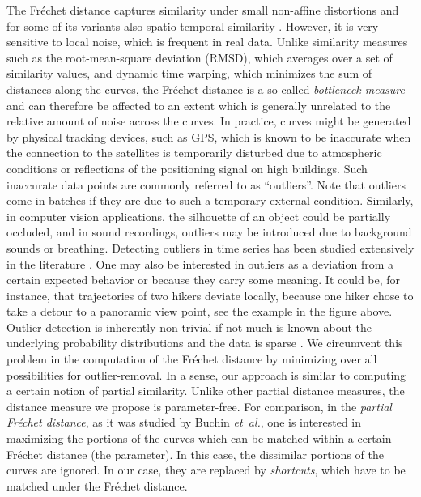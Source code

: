 \documentclass[12pt]{article}
\newcommand{\etal}{\textit{et~al.}\xspace}
\newcommand{\Frechet}{Fr\'{e}c{h}e{}t\xspace}\providecommand{\Arr}{\mathop{\mathrm{\EuScript{A}}}}
\numberwithin{figure}{section}
\numberwithin{equation}{section}
\begin{document}
The \Frechet distance captures similarity under small non-affine
distortions and for some of its variants also spatio-temporal
similarity \cite{mssz-fdsl-2011}.  However, it is very sensitive to
local noise, which is frequent in real data.  Unlike similarity
measures such as the root-mean-square deviation (RMSD), which averages
over a set of similarity values, and dynamic time warping, which
minimizes the sum of distances along the curves, the \Frechet distance
is a so-called \emph{bottleneck measure} and can therefore be affected
to an extent which is generally unrelated to the relative amount of
noise across the curves.  In practice, curves might be generated by
physical tracking devices, such as GPS, which is known to be
inaccurate when the connection to the satellites is temporarily
disturbed due to atmospheric conditions or reflections of the
positioning signal on high buildings. Such inaccurate data points are
commonly referred to as ``outliers''.  Note that outliers come in
batches if they are due to such a temporary external condition.
Similarly, in computer vision applications, the silhouette of an
object could be partially occluded, and in sound recordings, outliers
may be introduced due to background sounds or breathing.  Detecting
outliers in time series has been studied extensively in the literature
\cite{mmy-rs-06}.  One may also be interested in outliers as a
deviation from a certain expected behavior or because they carry some
meaning.  It could be, for instance, that trajectories of two hikers
deviate locally, because one hiker chose to take a detour to a
panoramic view point, see the example in the figure above. Outlier
detection is inherently non-trivial if not much is known about the
underlying probability distributions and the data is sparse
\cite{ay-eeaod-05}.  We circumvent this problem in the computation of
the \Frechet distance by minimizing over all possibilities for
outlier-removal.  In a sense, our approach is similar to computing a
certain notion of partial similarity.  Unlike other partial distance
measures, the distance measure we propose is parameter-free. For
comparison, in the \emph{partial \Frechet distance}, as it was studied
by Buchin \etal \cite{bbw-eapcm-09}, one is interested in maximizing
the portions of the curves which can be matched within a certain
\Frechet distance (the parameter). In this case, the dissimilar
portions of the curves are ignored. In our case, they are replaced by
\emph{shortcuts}, which have to be matched under the \Frechet
distance.
\end{document}
